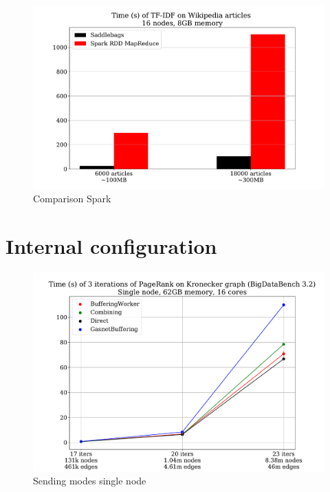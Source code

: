 \documentclass{uit-report}
\begin{document}
\begin{figure}[H]
	\centering
	\includegraphics[width=15cm]{illustrations/sparktfidf.pdf}
	\caption{Comparison Spark}
	\label{fig:sparktfidf}
\end{figure}


\section{Internal configuration} \label{section:configuration}

\begin{figure}[H]
	\centering
	\includegraphics[width=15cm]{illustrations/sendingmodes.pdf}
	\caption{Sending modes single node}
	\label{fig:sendingmodes}
\end{figure}
\end{document}
